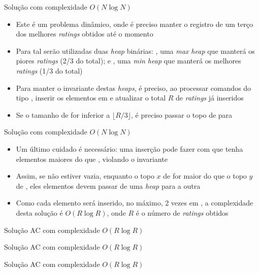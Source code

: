 \begin{frame}[fragile]{Solução com complexidade $O(N\log N)$}

    \begin{itemize}
        \item Este é um problema dinâmico, onde é preciso manter o registro de um terço
            dos melhores \textit{ratings} obtidos até o momento

        \item Para tal serão utilizadas duas \textit{heap} binárias: , uma 
            \textit{max heap} que manterá os piores \textit{ratings} (2/3 do total); e 
            , uma \textit{min heap} que manterá os melhores \textit{ratings}
            (1/3 do total)

        \item Para manter o invariante destas \textit{heaps}, é preciso, ao processar comandos
            do tipo , inserir os elementos em  e atualizar o total 
            $R$ de \textit{ratings} já inseridos

        \item Se o tamanho de  for inferior a $\lfloor R/3\rfloor$, é preciso
            passar o topo de  para 
   \end{itemize}

\end{frame}


\begin{frame}[fragile]{Solução com complexidade $O(N\log N)$}

    \begin{itemize}
        \item Um último cuidado é necessário: uma inserção pode fazer com que
             tenha elementos maiores do que , violando
            o invariante

        \item Assim, se  não estiver vazia, enquanto o topo $x$ de  
            for maior do que o topo $y$ de
            , eles elementos devem passar de uma \textit{heap} para a outra

        \item Como cada elemento será inserido, no máximo, 2 vezes em , a complexidade
            desta solução é $O(R\log R)$, onde $R$ é o número de \textit{ratings} obtidos
    \end{itemize}

\end{frame}

\begin{frame}[fragile]{Solução AC com complexidade $O(R\log R)$}
\end{frame}

\begin{frame}[fragile]{Solução AC com complexidade $O(R\log R)$}
\end{frame}

\begin{frame}[fragile]{Solução AC com complexidade $O(R\log R)$}
\end{frame}
